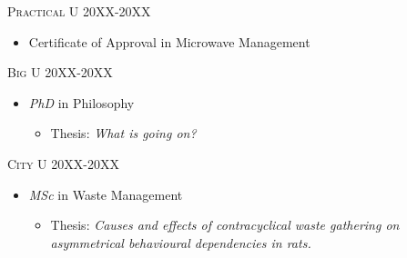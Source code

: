 





\begin{timeline}
	\item {\fontsize{11}{10}\textsc{Practical U}}
	\hfill 20XX-20XX
	\begin{itemize}[leftmargin=7mm, labelsep=2mm, itemsep=2mm, parsep=0mm]
		\item[\lline{olofblue}] Certificate of Approval in Microwave Management
	\end{itemize}

	\item {\fontsize{11}{10}\textsc{Big U}}
	\hfill 20XX-20XX
	\begin{itemize}[leftmargin=7mm, labelsep=2mm, itemsep=2mm, parsep=0mm]
		\item[\lline{olofblue}] {\textit{PhD}} in Philosophy
		\begin{itemize}
			\item[] Thesis: \textit{What is going on?}
		\end{itemize}
	\end{itemize}

	\item {\fontsize{11}{10}\textsc{City U}}
	\hfill 20XX-20XX
	\begin{itemize}[leftmargin=7mm, labelsep=2mm, itemsep=2mm, parsep=0mm]
		\item[\lline{olofblue}] {\textit{MSc}} in Waste Management
		\begin{itemize}
			\item[] Thesis: \textit{Causes and effects of contracyclical waste gathering on \\asymmetrical behavioural dependencies in rats.}
		\end{itemize}
	\end{itemize}
\end{timeline}
